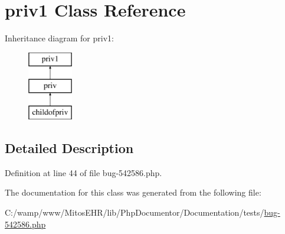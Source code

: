 \hypertarget{classpriv1}{\section{priv1 \-Class \-Reference}
\label{classpriv1}
}
\-Inheritance diagram for priv1\-:\begin{figure}[H]
\begin{center}
\leavevmode
\includegraphics[height=3.000000cm]{classpriv1}
\end{center}
\end{figure}


\subsection{\-Detailed \-Description}


\-Definition at line 44 of file bug-\/542586.\-php.



\-The documentation for this class was generated from the following file\-:\begin{DoxyCompactItemize}
\item 
\-C\-:/wamp/www/\-Mitos\-E\-H\-R/lib/\-Php\-Documentor/\-Documentation/tests/\hyperlink{bug-542586_8php}{bug-\/542586.\-php}\end{DoxyCompactItemize}
